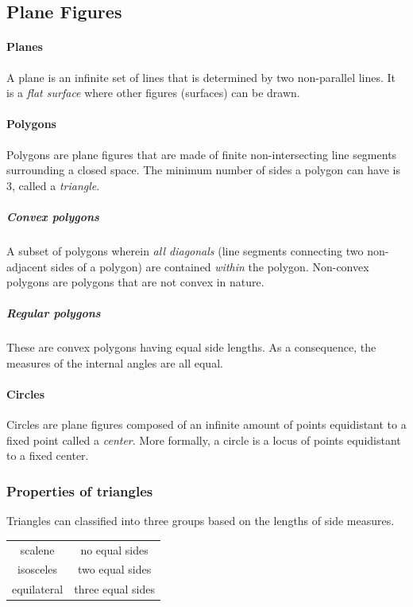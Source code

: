\subsection{Plane Figures}
\paragraph{Planes}
A plane is an infinite set of lines that is determined by two non-parallel lines.
It is a \emph{flat surface} where other figures (surfaces) can be drawn.

\paragraph{Polygons}
Polygons are plane figures that are made of finite non-intersecting line segments surrounding a closed space.
The minimum number of sides a polygon can have is $3$, called a \emph{triangle}.

\subparagraph{Convex polygons}
A subset of polygons wherein \emph{all diagonals} (line segments connecting two non-adjacent sides of a polygon) are contained \emph{within} the polygon.
Non-convex polygons are polygons that are not convex in nature. 

\subparagraph{Regular polygons}
These are convex polygons having equal side lengths.
As a consequence, the measures of the internal angles are all equal.

\paragraph{Circles}
Circles are plane figures composed of an infinite amount of points equidistant to a fixed point called a \emph{center}.
More formally, a circle is a locus of points equidistant to a fixed center.

\subsubsection{Properties of triangles}
Triangles can classified into three groups based on the lengths of side measures.

\begin{table}[h!]
    \centering
    \begin{tabular}{c|c}
        scalene & no equal sides \\
        isosceles & two equal sides \\
        equilateral & three equal sides
    \end{tabular}
\end{table}

